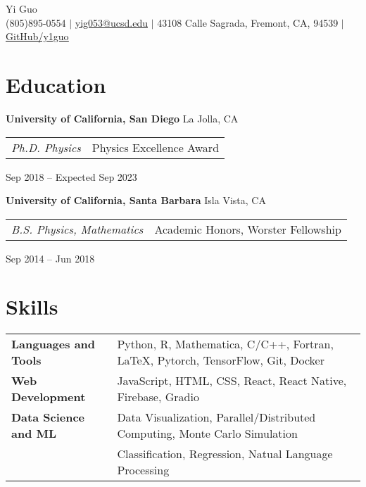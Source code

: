\documentclass[letterpaper,12pt]{article}
\begin{document}
\newcommand{\name}{Yi Guo}
\newcommand{\phone}{(805)895-0554}
\newcommand{\email}{yig053@ucsd.edu}
\newcommand{\address}{43108 Calle Sagrada, Fremont, CA, 94539}
\newcommand{\github}{y1guo}
\newcommand{\linkedin}{y1guo}
\newcommand{\website}{https://y1guo.github.io}

\begin{center}
    \Huge \name \\
    \vspace{1pt}
    \small \phone 
    $|$ \href{mailto:\email}{\underline{\email}} 
    $|$ \address
    $|$ \href{https://github.com/\github}{\underline{GitHub/\github}} 
    \vspace{-15pt}
\end{center}


\section{Education}

\textbf{University of California, San Diego} \hfill La Jolla, CA \\
\begin{tabular}{p{12em} p{20em}}
    \textit{Ph.D. Physics} 
    & Physics Excellence Award 
\end{tabular}
\hfill Sep 2018 -- Expected Sep 2023

\textbf{University of California, Santa Barbara} \hfill Isla Vista, CA \\
\begin{tabular}{p{12em} p{20em}}
    \textit{B.S. Physics, Mathematics}
    & Academic Honors, Worster Fellowship
\end{tabular}
\hfill Sep 2014 -- Jun 2018


\section{Skills}

\begin{tabular}{p{10em} p{33em}}
    \textbf{Languages and Tools} 
    & Python, R, Mathematica, C/C++, Fortran, \LaTeX, Pytorch, TensorFlow, Git, Docker \\
    \textbf{Web Development}
    & JavaScript, HTML, CSS, React, React Native, Firebase, Gradio \\
    \textbf{Data Science and ML} 
    & Data Visualization, Parallel/Distributed Computing, Monte Carlo Simulation \\
    & Classification, Regression, Natual Language Processing
\end{tabular}
\end{document}
